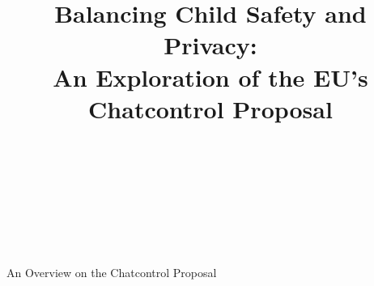 \documentclass[10pt]{article}
\begin{document}
\title{Balancing Child Safety and Privacy:\\ {\large An Exploration of the EU's Chatcontrol Proposal}%
%
}

\author{\\[2pt] 
\\
\\
\\
\\
}

%
%
{An Overview on the Chatcontrol Proposal} 

\maketitle

\begin{abstract}

\end{abstract}

\begin{keywords}

\end{keywords}








\printbibliography
\end{document}
